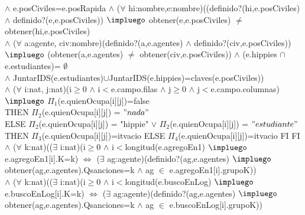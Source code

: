 { $\wedge$ e.posCiviles=e.posRapida $\wedge$ ($\forall$ hi:nombre,e:nombre)((definido?(hi,e.posCiviles) $\wedge$ definido?(e,e.posCiviles)) $\impluego$ obtener(e,e.posCiviles) $\neq$ obtener(hi,e.posCiviles) \\$\wedge$ ($\forall$ a:agente, civ:nombre)(definido?(a,e.agentes) $\wedge$ definido?(civ,e.posCiviles)) \\ $\impluego$ (obtener(a,e.agentes) $\neq$ obtener(civ,e.posCiviles)) $\wedge$ (e.hippies $\cap$ e.estudiantes)= $\emptyset$ \\ $\wedge$ JuntarIDS(e.estudiantes)$\cup$JuntarIDS(e.hippies)=claves(e.posCiviles)) \\ $\wedge$ ($\forall$ i:nat, j:nat)(i$\geq$0 $\wedge$ i$<$e.campo.filas $\wedge$ j$\geq$0 $\wedge$ j$<$e.campo.columnas) $\impluego$ \IF $\Pi_{1}$(e.quienOcupa[i][j])=false \\ THEN $\Pi_{2}$(e.quienOcupa[i][j]) = $"nada"$ \\ ELSE \IF $\Pi_{2}$(e.quienOcupa[i][j]) = "hippie" $\vee$ $\Pi_{2}$(e.quienOcupa[i][j]) = $"estudiante"$ THEN $\Pi_{3}$(e.quienOcupa[i][j])=itvacio ELSE   $\Pi_{4}$(e.quienOcupa[i][j])=itvacio FI FI \\ $\wedge$ ($\forall$ k:nat)(($\exists$ i:nat)(i$\geq$0 $\wedge$ i$<$longitud(e.agregoEn1) $\impluego$ e.agregoEn1[i].K=k) $\Longleftrightarrow$ ($\exists$ ag:agente)(definido?(ag,e.agentes) $\impluego$ obtener(ag,e.agentes).Qsanciones=k $\wedge$ ag $\in$ e.agregoEn1[i].grupoK)) \\ $\wedge$ ($\forall$ k:nat)(($\exists$ i:nat)(i$\geq$0 $\wedge$ i$<$longitud(e.buscoEnLog) $\impluego$ e.buscoEnLog[i].K=k) $\Longleftrightarrow$ ($\exists$ ag:agente)(definido?(ag,e.agentes) $\impluego$ obtener(ag,e.agentes).Qsanciones=k $\wedge$ ag $\in$ e.buscoEnLog[i].grupoK)) } 	
\disFuncionDeAbstraccion
\vspace*{-1em}




\newpage

